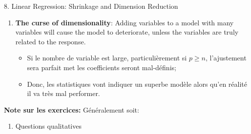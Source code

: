 \documentclass[12pt, titlepage, french]{report}
\begin{document}
\begin{CHPT_SUMM}[label = {VALID-SHRINKAGE}]{8. Linear Regression:  Shrinkage and Dimension Reduction}
\begin{enumerate}
\begin{enumerate}
\begin{itemize}
			\item	Les $\phi_{ji}$ sont surnommés les \textbf{loadings} et les $z_{i1}$ les \textbf{principal component scores};
			\item	Les \textit{scores} sont la distance entre les points et les \textit{principal components};
			\item	La \textbf{régression} de principal components (PCR) est \textbf{sur les principal components};
			\item	Puisqu'ils sont des moyennes pondérées de toutes les variables, PCR ne \textbf{fait pas la sélection de variable} et est semblable à la régression ridge dans ce sens;
			\item	Le plus de composantes, le plus faible le biais et le plus élevé la variance.
		\end{itemize}
		\item	\textbf{Partial Least Squares}: méthode \textit{supervisée};
		\begin{itemize}
			\item	Puisque la variable réponse est prise en compte, la direction n'est pas aussi bien ajusté;
			\item	Les prédicteurs cependant seront mieux à expliquer la réponse;
			\item	Réduit le biais en comparaison au PCA, mais augmente la variance et donc n'est pas globalement supérieur au PCA.
		\end{itemize}
	\end{enumerate}
	\item	\textbf{The curse of dimensionality}: Adding variables to a model with many variables will cause the model to deteriorate, unless the variables are truly related to the response.
	\begin{itemize}
		\item	Si le nombre de variable est large, particulièrement si $p \ge n$, l'ajustement sera parfait met les coefficients seront mal-définis;
		\item	Donc, les statistiques vont indiquer un superbe modèle alors qu'en réalité il va très mal performer.
	\end{itemize}
\end{enumerate}
\textbf{Note sur les exercices:} Généralement soit:
\begin{enumerate}
	\item	Questions qualitatives

\end{enumerate}
\end{CHPT_SUMM}
\end{document}
